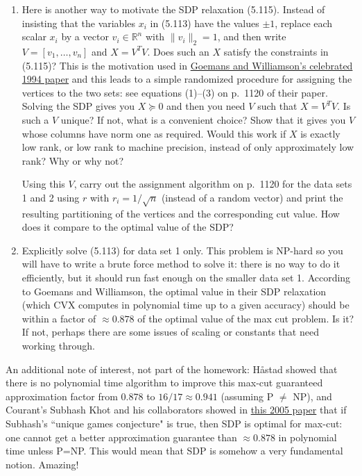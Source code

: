 \documentclass[11pt]{article}
\newcommand{\R}{\mathbb R}
\begin{document}
\begin{enumerate}
\begin{enumerate}
 \item Here is another way to motivate the SDP relaxation (5.115). Instead of insisting that the variables $x_i$ in (5.113) have the
 values $\pm 1$, replace
 each scalar $x_i$ by a vector $v_i\in\R^n$ with $\|v_i\|_2=1$, and then write $V=[v_1,\ldots,v_n]$ and $X=V^TV$. 
 Does such an $X$ satisfy the constraints in (5.115)? This is the motivation used
 in \href{http://www-math.mit.edu/~goemans/PAPERS/maxcut-jacm.pdf}{Goemans and Williamson's celebrated 1994 paper} 
 and this leads to a simple randomized procedure for assigning the vertices to the two sets: see equations (1)--(3) on p.~1120 of
 their paper. Solving the SDP gives you $X\succeq 0$ and then you need $V$ such that $X=V^TV$. Is such a $V$ unique? If not, what
 is a convenient choice? Show that it gives you $V$ whose columns have norm one as required. Would this work if $X$ is exactly low rank,
 or low rank to machine precision, instead of only approximately low rank? Why or why not?
 
 Using this $V$, carry out the assignment algorithm on p.~1120 for the data sets 1 and 2 using $r$ with $r_i=1/\sqrt{n}$ 
 (instead of a random vector) and print the resulting partitioning of the
 vertices and the corresponding cut value. How does it compare to the optimal value of the SDP?

  
 \item Explicitly solve (5.113) for data set 1 only.
 This problem is NP-hard so you will have to write a brute force method to solve it: there is no way to do it efficiently, but it should
 run fast enough on the smaller data set 1. According to Goemans and Williamson,
 the optimal value in their SDP relaxation (which CVX computes in polynomial time up to a given accuracy)
 should be within a factor of $\approx 0.878$ of the optimal value of the max cut problem. Is it? If not, perhaps there are some issues of scaling
 or constants that need working through. 
 \end{enumerate}
 
 An additional note of interest, not part of the homework: 
 H{\aa{}}stad showed that there is no polynomial time algorithm to improve
 this max-cut guaranteed approximation factor from 0.878 to $16/17\approx 0.941$ (assuming P $\not =$ NP), and 
 Courant's Subhash Khot and his collaborators showed in 
 \href{https://www.cs.cmu.edu/~odonnell/papers/maxcut.pdf}{this 2005 paper} that if Subhash's ``unique games conjecture" is true, then SDP is optimal for max-cut: one cannot get a better approximation
guarantee than $\approx 0.878$ in polynomial time unless P=NP. 
This would mean that SDP is somehow a very fundamental notion. Amazing!
 
\end{enumerate}
\end{document}
